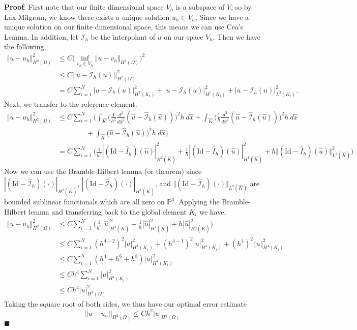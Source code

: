 \documentclass[11pt]{article}
\newcommand{\wh}{\widehat}
\begin{document}
\textbf{Proof}: First note that our finite dimensional space $V_h$ is a subspace of $V$, so by Lax-Milgram, we know there exists a unique solution $u_h\in V_h$.
Since we have a unique solution on our finite dimensional space, this means we can use Cea's Lemma.
In addition, let $\mathcal{I}_h$ be the interpolant of $u$ on our space $V_h$. Then we have the following,
\begin{align*}
	\Vert u - u_h\Vert_{H^2(\Omega)}^2 &\leq C \Big(\inf_{v_h\in V_h} \Vert u - v_h\Vert_{H^2(\Omega)}\Big)^2 \\
	&\leq C||u - \mathcal{I}_h(u)||_{H^2(\Omega)}^2 \\
	&= C\sum_{i=1}^N |u - \mathcal{I}_h(u)|^2_{H^2(K_i)} + |u- \mathcal{I}_h(u)|^2_{H^1(K_i)} + |u - \mathcal{I}_h(u)|^2_{L^2(K_i)}.
\end{align*}
Next, we transfer to the reference element.
\begin{align*}
	\Vert u - u_h\Vert_{H^2(\Omega)}^2 
	&\leq C \sum_{i=1}^N \Big( \int_{\wh{K}} \Big( \frac{1}{h^2}\frac{d^2}{d\wh{x}^2} (\wh{u} - \wh{\mathcal{I}}_h(\wh{u})) \Big)^2 h \: d\wh{x} 
	+ \int_{\wh{K}} \Big( \frac{1}{h}\frac{d^2}{d\wh{x}^2} (\wh{u} - \wh{\mathcal{I}}_h(\wh{u})) \Big)^2 h \: d\wh{x} \\
	&\qquad\qquad + \int_{\wh{K}} \big(\wh{u} - \wh{\mathcal{I}}_h(\wh{u}) \big)^2 h \: d\wh{x} \Big) \\
	&= C \sum_{i=1}^N \Big( \frac{1}{h^3} |(\text{Id} - \wh{I}_h)(\wh{u}) |^2_{H^2(\wh{K})}
		+ \frac{1}{h} |(\text{Id} - \wh{I}_h)(\wh{u}) |^2_{H^1(\wh{K})} 
	+  h \Vert(\text{Id} - \wh{I}_h)(\wh{u}) \Vert^2_{L^2(\wh{K})} \Big)
\end{align*}
Now we can use the Bramble-Hilbert lemma (or theorem) since 
$|(\text{Id} - \wh{\mathcal{I}}_h)(\cdot) |_{H^2(\wh{K})}$, 
$|(\text{Id} - \wh{\mathcal{I}}_h)(\cdot) |_{H^1(\wh{K})}$, and 
$\Vert(\text{Id} - \wh{\mathcal{I}}_h)(\cdot) \Vert_{L^2(\wh{K})}$ 
are bounded sublinear functionals which are all zero on $\mathbb{P}^3$.  
Applying the Bramble-Hilbert lemma and transferring back to the global element $K_i$ we have,
\begin{align*}
	\Vert u - u_h\Vert_{H^2(\Omega)}^2 &\leq C \sum_{i=1}^N \Big( \frac{1}{h^3}|\wh{u}|^2_{H^4(\wh{K})} 
+ \frac{1}{h}|\wh{u}|^2_{H^4(\wh{K})} + h|\wh{u}|^2_{H^4(\wh{K})} \Big) \\
	&\leq C\sum_{i=1}^N (h^{4-2})^2|u|_{H^4(K_i)}^2 + (h^{4-1})^2|u|_{H^4(K_i)}^2 + (h^4)^2\Vert u\Vert _{H^4(K_i)}^2 \\
	&\leq C\sum_{i=1}^N (h^4 + h^6 + h^8) |u|_{H^4(K_i)}^2 \\
	&\leq Ch^4\sum_{i=1}^N |u|_{H^4(K_i)}^2 \\
	&\leq Ch^4 |u|_{H^4(\Omega)}^2
\end{align*}
Taking the square root of both sides, we thus have our optimal error estimate
\[ ||u - u_h||_{H^2(\Omega)} \leq Ch^2 |u|_{H^4(\Omega)} \]
$\blacksquare$
\end{document}
